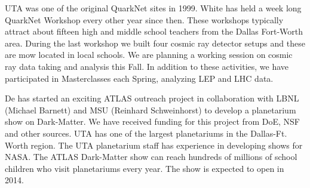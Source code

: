 
UTA was one of the original QuarkNet sites in 1999. White has held a week long
QuarkNet Workshop every other year since then. These workshops typically
attract about fifteen high and middle school teachers from the Dallas Fort-Worth
area. During the last workshop we built four cosmic ray detector setups and
these are mow located in local schools. We are planning a working session on
cosmic ray data taking and analysis this Fall. In addition to these activities,
we have participated in Masterclasses each Spring, analyzing LEP and LHC data.

De has started an exciting ATLAS outreach project in collaboration with LBNL (Michael Barnett) and MSU (Reinhard Schweinhorst) to develop a planetarium show on Dark-Matter. We have received funding for this project from DoE, NSF and other sources. UTA has one of the largest planetariums in the Dallas-Ft. Worth region. The UTA planetarium staff has experience in developing shows for NASA. The ATLAS Dark-Matter show can reach hundreds of millions of school children who visit planetariums every year. The show is expected to open in 2014.
